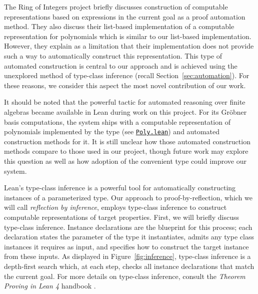 The Ring of Integers project \cite{RingOfIntegers2025} briefly discusses construction of computable representations based on expressions in the current goal as a proof automation method. They also discuss their list-based implementation of a computable representation for polynomials which is similar to our list-based implementation. However, they explain as a limitation that their implementation does not provide such a way to automatically construct this representation. This type of automated construction is central to our approach and is achieved using the unexplored method of type-class inference (recall Section~\ref{sec:automation}). For these reasons, we consider this aspect the most novel contribution of our work.

It should be noted that the powerful  tactic \cite{Grind} for automated reasoning over finite algebras became available in Lean during work on this project. For its Gröbner basis computations, the system ships with a computable representation of polynomials implemented by the  type (see \href{https://github.com/leanprover/lean4/blob/master/src/Init/Grind/Ring/Poly.lean}{\texttt{Poly.lean}}) and automated construction methods for it. It is still unclear how those automated construction methods compare to those used in our project, though future work may explore this question as well as how adoption of the convenient  type could improve our system.

\label{sec:reflection}


Lean's type-class inference is a powerful tool for automatically constructing instances of a parameterized type. Our approach to proof-by-reflection, which we will call \emph{reflection by inference}, employs type-class inference to construct computable representations of target properties. First, we will briefly discuss type-class inference. Instance declarations are the blueprint for this process; each declaration states the parameter of the type it instantiates, admits any type class instances it requires as input, and specifies how to construct the target instance from these inputs. As displayed in Figure~\ref{fig:inference}, type-class inference is a depth-first search which, at each step, checks all instance declarations that match the current goal. For more details on type-class inference, consult the \textit{Theorem Proving in Lean 4} handbook \cite{TypeClasses}.

